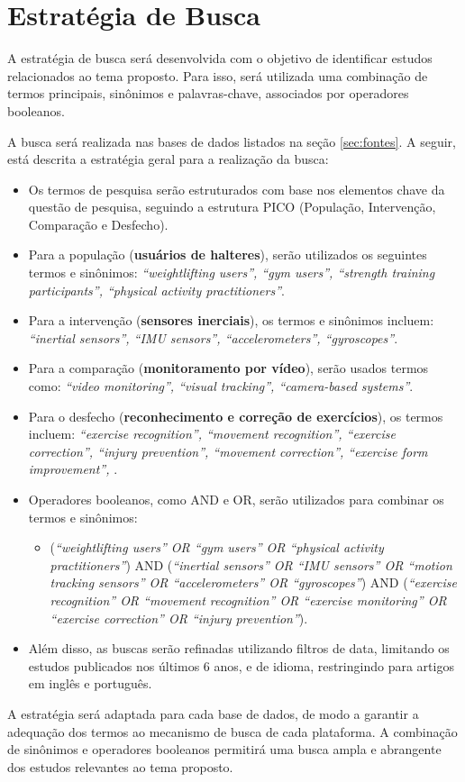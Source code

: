 \documentclass[a4paper,12pt]{article}
\begin{document}
\section{Estratégia de Busca}

A estratégia de busca será desenvolvida com o objetivo de identificar estudos relacionados ao tema proposto. Para isso, será utilizada uma combinação de termos principais, sinônimos e palavras-chave, associados por operadores booleanos.

A busca será realizada nas bases de dados listados na seção \ref{sec:fontes}. A seguir, está descrita a estratégia geral para a realização da busca:

\begin{itemize}
    \item Os termos de pesquisa serão estruturados com base nos elementos chave da questão de pesquisa, seguindo a estrutura PICO (População, Intervenção, Comparação e Desfecho).
    
    \item Para a população (\textbf{usuários de halteres}), serão utilizados os seguintes termos e sinônimos: \textit{“weightlifting users”, “gym users”, “strength training participants”, “physical activity practitioners”}.
    
    \item Para a intervenção (\textbf{sensores inerciais}), os termos e sinônimos incluem: \textit{“inertial sensors”, “IMU sensors”, “accelerometers”, “gyroscopes”}.
    
    \item Para a comparação (\textbf{monitoramento por vídeo}), serão usados termos como: \textit{“video monitoring”, “visual tracking”, “camera-based systems”}.
    
    \item Para o desfecho (\textbf{reconhecimento e correção de exercícios}), os termos incluem: \textit{“exercise recognition”, “movement recognition”, “exercise correction”, “injury prevention”, “movement correction”, “exercise form improvement”, }.
    
    \item Operadores booleanos, como AND e OR, serão utilizados para combinar os termos e sinônimos: 
    \begin{itemize}
        \item (\textit{“weightlifting users” OR “gym users” OR “physical activity practitioners”}) AND (\textit{“inertial sensors” OR “IMU sensors” OR “motion tracking sensors” OR “accelerometers” OR “gyroscopes”}) AND (\textit{“exercise recognition” OR “movement recognition” OR “exercise monitoring” OR “exercise correction” OR “injury prevention”}).
    \end{itemize}
    
    \item Além disso, as buscas serão refinadas utilizando filtros de data, limitando os estudos publicados nos últimos 6 anos, e de idioma, restringindo para artigos em inglês e português.
\end{itemize}

A estratégia será adaptada para cada base de dados, de modo a garantir a adequação dos termos ao mecanismo de busca de cada plataforma. A combinação de sinônimos e operadores booleanos permitirá uma busca ampla e abrangente dos estudos relevantes ao tema proposto.
\end{document}
